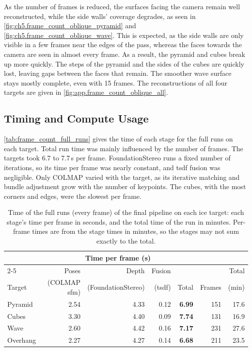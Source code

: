 As the number of frames is reduced, the surfaces facing the camera remain well reconstructed, while the side walls' coverage degrades,
as seen in \autoref{fig:ch5.frame_count_oblique_pyramid} and \autoref{fig:ch5.frame_count_oblique_wave}. This is
expected, as the side walls are only visible in a few frames near the edges of the pass, whereas the faces towards the
camera are seen in almost every frame. As a result, the pyramid and cubes break up more quickly. The steps of the
pyramid and the sides of the cubes are quickly lost, leaving gaps between the faces that remain. The smoother wave
surface stays mostly complete, even with  15 frames. The reconstructions of all four targets are given in
\autoref{fig:app.frame_count_oblique_all}.

\subsection{Timing and Compute Usage}

\autoref{tab:frame_count_full_runs} gives the time of each stage for the full runs on each target. Total run time
was mainly influenced by the number of frames. The targets took 6.7 to 7.7\,s per frame. FoundationStereo runs a fixed number of iterations, 
so its time per frame was
nearly constant, and \gls{tsdf} fusion was negligible. Only COLMAP varied with the target, as its iterative matching and
bundle adjustment grow with the number of keypoints. The cubes, with the most corners and edges, were the slowest
per frame.

\begin{table}[H]
\centering
\small
\caption{Time of the full runs (every frame) of the final pipeline on each ice target: each stage's time per
frame in seconds, and the total time of the run in minutes. Per-frame times are from the stage times in minutes, so
the stages may not sum exactly to the total.}
\label{tab:frame_count_full_runs}
\begin{tabular}{lrrrrrr}
\toprule
 & \multicolumn{4}{c}{Time per frame (s)} & & \\
\cmidrule(lr){2-5}
 & Poses & Depth & Fusion & & & Total \\
Target & (COLMAP \acrshort{sfm}) & (FoundationStereo) & (\acrshort{tsdf}) & Total & Frames & (min) \\
\midrule
Pyramid  & 2.54 & 4.33 & 0.12 & \textbf{6.99} & 151 & 17.6 \\
Cubes    & 3.30 & 4.40 & 0.09 & \textbf{7.74} & 131 & 16.9 \\
Wave     & 2.60 & 4.42 & 0.16 & \textbf{7.17} & 231 & 27.6 \\
Overhang & 2.27 & 4.27 & 0.14 & \textbf{6.68} & 211 & 23.5 \\
\bottomrule
\end{tabular}
\end{table}

